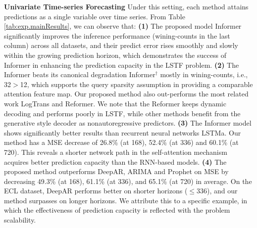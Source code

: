\documentclass[letterpaper]{article} %
\newcommand{\mn}{Informer}
\begin{document}
\textbf{Univariate Time-series Forecasting}
Under this setting, each method attains predictions as a single variable over time series. From Table \ref{tab:exp.mainResults}, we can observe that:
\textbf{(1)} The proposed model {\mn} significantly improves the inference performance (wining-counts in the last column) across all datasets, and their predict error rises smoothly and slowly within the growing prediction horizon, which demonstrates the success of {\mn} in enhancing the prediction capacity in the LSTF problem.
\textbf{(2)} The {\mn} beats its canonical degradation \mn$^{\dag}$ mostly in wining-counts, i.e., 32$>$12, which supports the query sparsity assumption in providing a comparable attention feature map. Our proposed method also out-performs the most related work LogTrans and Reformer. We note that the Reformer keeps dynamic decoding and performs poorly in LSTF, while other methods benefit from the generative style decoder as nonautoregressive predictors.
\textbf{(3)} The {\mn} model shows significantly better results than recurrent neural networks LSTMa. Our method has a MSE decrease of 26.8\% (at 168), 52.4\% (at 336) and 60.1\% (at 720).
This reveals a shorter network path in the self-attention mechanism acquires better prediction capacity than the RNN-based models.
\textbf{(4)} The proposed method outperforms DeepAR, ARIMA and Prophet on MSE by decreasing 49.3\% (at 168), 61.1\% (at 336), and 65.1\% (at 720) in average.
On the ECL dataset, DeepAR performs better on shorter horizons ($\leq 336$), and our method surpasses on longer horizons. We attribute this to a specific example, in which the effectiveness of prediction capacity is reflected with the problem scalability.
\end{document}
